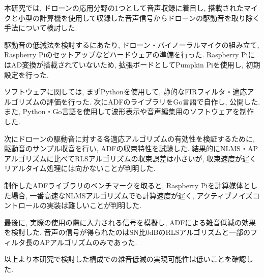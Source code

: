 \begin{jabstract}
本研究では, ドローンの応用分野の1つとして音声収録に着目し, 搭載されたマイクと小型の計算機を使用して収録した音声信号からドローンの駆動音を取り除く手法について検討した. 

駆動音の低減法を検討するにあたり, ドローン・バイノーラルマイクの組み立て, Raspberry
Piのセットアップなどハードウェアの準備を行った.  Raspberry
PiにはAD変換が搭載されていないため, 拡張ボードとしてPumpkin
Piを使用し, 初期設定を行った. 

ソフトウェアに関しては, まずPythonを使用して, 静的なFIRフィルタ・適応アルゴリズムの評価を行った. 次にADFのライブラリをGo言語で自作し, 公開した. また, Python・Go言語を使用して波形表示や音声編集用のソフトウェアを制作した. 

次にドローンの駆動音に対する各適応アルゴリズムの有効性を検証するために, 駆動音のサンプル収音を行い, ADFの収束特性を試験した. 結果的にNLMS・APアルゴリズムに比べてRLSアルゴリズムの収束誤差は小さいが, 収束速度が遅くリアルタイム処理には向かないことが判明した. 

制作したADFライブラリのベンチマークを取ると, Raspberry
Piを計算媒体とした場合, 一番高速なNLMSアルゴリズムでも計算速度が遅く, アクティブノイズコントロールの実装は難しいことが判明した. 

最後に, 実際の使用の際に入力される信号を模擬し, ADFによる雑音低減の効果を検討した. 音声の信号が得られたのはSN比0dBのRLSアルゴリズムと一部のフィルタ長のAPアルゴリズムのみであった. 

以上より本研究で検討した構成での雑音低減の実現可能性は低いことを確認した. 
\end{jabstract}
